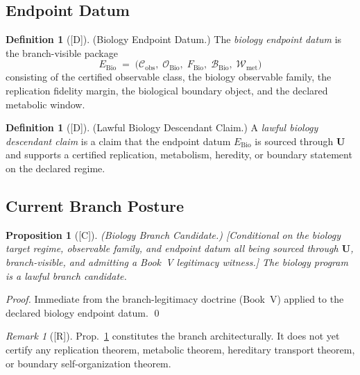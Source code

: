 \documentclass[12pt,oneside]{amsbook}
\theoremstyle{plain}
\newtheorem{proposition}[theorem]{Proposition}
\theoremstyle{definition}
\newtheorem{definition}[theorem]{Definition}
\theoremstyle{remark}
\newtheorem{remark}[theorem]{Remark}
\newcommand{\status}[1]{\textup{[#1]}}
\begin{document}
\subsection{Endpoint Datum}\label{sec:bio-endpoint}

\begin{definition}[\status{D}]\label{def:bio-endpoint}
\textup{(Biology Endpoint Datum.)}
The \emph{biology endpoint datum} is the branch-visible package
\[
 E_{\mathrm{Bio}} \;=\;
 \bigl(\mathcal{C}_{\mathrm{obs}},\;
 \mathcal{O}_{\mathrm{Bio}},\;
 F_{\mathrm{Bio}},\;
 \mathcal{B}_{\mathrm{Bio}},\;
 \mathcal{W}_{\mathrm{met}}\bigr)
\]
consisting of the certified observable class, the biology observable
family, the replication fidelity margin, the biological boundary
object, and the declared metabolic window.
\end{definition}

\begin{definition}[\status{D}]\label{def:lawful-bio-descendant}
\textup{(Lawful Biology Descendant Claim.)}
A \emph{lawful biology descendant claim} is a claim that the endpoint
datum $E_{\mathrm{Bio}}$ is sourced through $\mathbf{U}$ and supports
a certified replication, metabolism, heredity, or boundary statement
on the declared regime.
\end{definition}

\subsection{Current Branch Posture}\label{sec:bio-posture}

\begin{proposition}[\status{C}]\label{prop:bio-branch-candidate}
\textup{(Biology Branch Candidate.)}
\textup{[Conditional on the biology target regime, observable family,
and endpoint datum all being sourced through $\mathbf{U}$,
branch-visible, and admitting a Book~V legitimacy witness.]}
The biology program is a lawful branch candidate.
\end{proposition}

\begin{proof}
Immediate from the branch-legitimacy doctrine (Book~V) applied to the
declared biology endpoint datum.
\qed
\end{proof}

\begin{remark}[\status{R}]\label{rem:bio-posture-note}
Prop.~\ref{prop:bio-branch-candidate} constitutes the branch
architecturally. It does not yet certify any replication theorem,
metabolic theorem, hereditary transport theorem, or boundary
self-organization theorem.
\end{remark}
\end{document}
